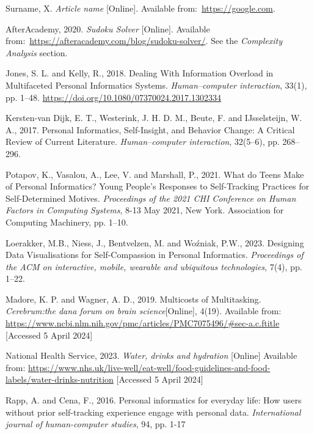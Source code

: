 \documentclass[12pt]{article}
\begin{document}
\renewcommand{\refname}{} 
\vspace{-20pt}
\begin{thebibliography}{99}
     Surname, X. \textit{Article name} [Online].
    Available from:~\url{https://google.com}.

     AfterAcademy, 2020. \textit{Sudoku Solver} [Online].
    Available from:~\url{https://afteracademy.com/blog/sudoku-solver/}. See the
    \textit{Complexity Analysis} section.

    Jones, S. L. and Kelly, R., 2018. 
    Dealing With Information Overload in Multifaceted Personal Informatics Systems. 
    \textit{Human–computer interaction}, 33(1), pp. 1–48. \url{https://doi.org/10.1080/07370024.2017.1302334}

    Kersten-van Dijk, E. T., Westerink, J. H. D. M., Beute, F. and 
    IJsselsteijn, W. A., 2017. 
    Personal Informatics, Self-Insight, and Behavior Change: A Critical Review of Current Literature. 
    \textit{Human–computer interaction}, 32(5–6), pp. 268–296.

    Potapov, K., Vasalou, A., Lee, V. and Marshall, P., 2021. 
    What do Teens Make of Personal Informatics? 
    Young People's Responses to Self-Tracking Practices for Self-Determined Motives. 
    \textit{Proceedings of the 2021 CHI Conference on Human Factors in Computing Systems}, 
    8-13 May 2021, New York. Association for Computing Machinery, pp. 1–10.

    Loerakker, M.B., Niess, J., Bentvelzen, M. and Woźniak, P.W., 2023. 
    Designing Data Visualisations for Self-Compassion in Personal Informatics. 
    \textit{Proceedings of the ACM on interactive, mobile, wearable and ubiquitous technologies}, 7(4), pp. 1–22.

    Madore, K. P. and Wagner, A. D., 2019. Multicosts of Multitasking. 
    \textit{Cerebrum:the dana forum on brain science}[Online], 4(19). Available from:
    \url{https://www.ncbi.nlm.nih.gov/pmc/articles/PMC7075496/#sec-a.c.ftitle} 
    [Accessed 5 April 2024]

    National Health Service, 2023. \textit{Water, drinks and hydration} [Online] 
    Available from: 
    \url{https://www.nhs.uk/live-well/eat-well/food-guidelines-and-food-labels/water-drinks-nutrition} 
    [Accessed 5 April 2024]
    
    Rapp, A. and Cena, F., 2016. Personal informatics for everyday life: 
    How users without prior self-tracking experience engage with personal data. 
    \textit{International journal of human-computer studies}, 94, pp. 1-17


\end{thebibliography}
\end{document}
